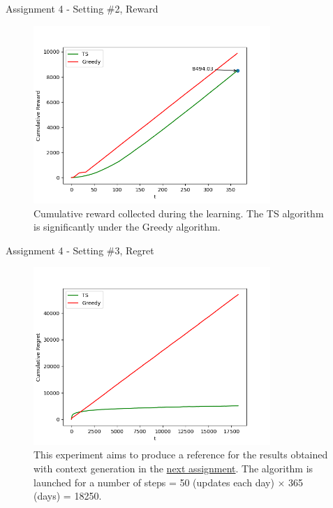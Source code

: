 \documentclass[11pt]{beamer}
\begin{document}
\begin{frame}{Assignment 4 - Setting \#2, Reward}
\begin{figure}[hbtp]
\centering
\includegraphics[width=0.8\textwidth]{images/assignment_4_exp_2_cum_reward.png}
\caption{Cumulative reward collected during the learning. The TS algorithm is significantly under the Greedy algorithm.}
\end{figure}
\end{frame}

\begin{frame}{Assignment 4 - Setting \#3, Regret}
\begin{figure}[hbtp]
\centering
\includegraphics[width=0.8\textwidth]{images/assignment_4_exp_3_cum_regret.png}
\caption{This experiment aims to produce a reference for the results obtained with context generation in the \hyperlink{page.42}{next assignment}. The algorithm is launched for a number of steps = 50 (updates each day) $\times$ 365 (days) = 18250.}
\end{figure}
\end{frame}
\end{document}
